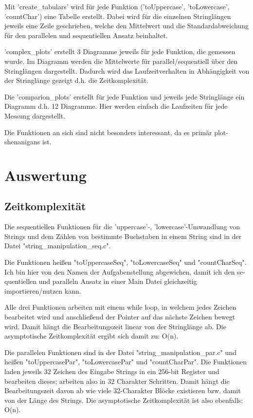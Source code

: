 \documentclass[plainarticle,zihtitle,german,final,hyperref,utf8]{zihpub}
\begin{document}
Mit 'create\_tabulars' wird für jede Funktion ('toUppercase', 'toLowercase', 'countChar') eine Tabelle erstellt. Dabei wird für die einzelnen Stringlängen jeweils eine Zeile geschrieben, welche den Mittelwert und die Standardabweichung für den parallelen und sequentiellen Ansatz beinhaltet.

'complex\_plots' erstellt 3 Diagramme jeweils für jede Funktion, die gemessen wurde. Im Diagramm werden die Mittelwerte für parallel/sequentiell über den Stringlängen dargestellt. Dadurch wird das Laufzeitverhalten in Abhängigkeit von der Stringlänge gezeigt d.h. die Zeitkomplexität.

Die 'comparion\_plots' erstellt für jede Funktion und jeweils jede Stringlänge ein Diagramm d.h. 12 Diagramme.
Hier werden einfach die Laufzeiten für jede Messung dargestellt.

Die Funktionen an sich sind nicht besonders interessant, da es primär plot-shenanigans ist.


\section{Auswertung}
\subsection{Zeitkomplexität}
Die se­quen­ti­ellen Funktionen für die 'uppercase'-, 'lowercase'-Umwandlung von Strings und dem Zählen von bestimmte Buchstaben in einem String sind in der Datei "string\_manipulation\_seq.c".

Die Funktionen heißen "toUppercaseSeq", "toLowercaseSeq" und "countCharSeq". Ich bin hier von den Namen der Aufgabenstellung abgewichen, damit ich den se­quen­ti­ellen und paralleln Ansatz in einer Main Datei gleichzeitig importieren/nutzen kann.

Alle drei Funktionen arbeiten mit einem while loop, in welchem jedes Zeichen bearbeitet wird und anschließend der Pointer auf das nächste Zeichen bewegt wird. Damit hängt die Bearbeitungszeit linear von der Stringlänge ab. Die asymptotische Zeitkomplexität ergibt sich damit zu: O(n).
\newline

Die parallelen Funktionen sind in der Datei "string\_manipulation\_par.c" und heißen "toUppercasePar", "toLowercasePar" und "countCharPar".
Die Funktionen laden jeweils 32 Zeichen des Eingabe Strings in ein 256-bit Register und bearbeiten dieses; arbeiten also in 32 Charakter Schritten.
Damit hängt die Bearbeitungszeit davon ab wie viele 32-Charakter Blöcke existieren bzw. damit von der Länge des Strings. Die asymptotische Zeitkomplexität ist also ebenfalls: O(n).
\newline
\end{document}
